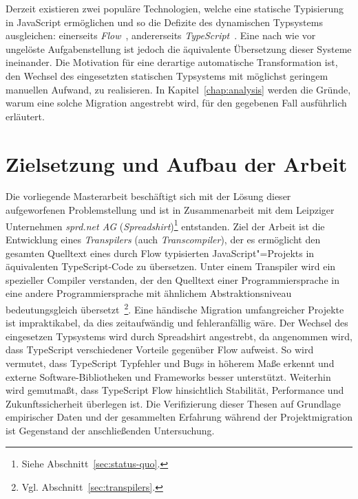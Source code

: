 Derzeit existieren zwei populäre Technologien, welche eine statische Typisierung in JavaScript ermöglichen und so die Defizite des dynamischen Typsystems ausgleichen: einerseits \textit{Flow}~\autocite{FLOW:PAPER}, andererseits \textit{TypeScript}~\autocite{TYPESCRIPT:SPEC}. Eine nach wie vor ungelöste Aufgabenstellung ist jedoch die äquivalente Übersetzung dieser Systeme ineinander. Die Motivation für eine derartige automatische Transformation ist, den Wechsel des eingesetzten statischen Typsystems mit möglichst geringem manuellen Aufwand, zu realisieren. In Kapitel~\ref{chap:analysis} werden die Gründe, warum eine solche Migration angestrebt wird, für den gegebenen Fall ausführlich erläutert.

\section{Zielsetzung und Aufbau der Arbeit}

Die vorliegende Masterarbeit beschäftigt sich mit der Lösung dieser aufgeworfenen Problemstellung und ist in Zusammenarbeit mit dem Leipziger Unternehmen \textit{sprd.net AG} (\textit{Spreadshirt})\footnote{Siehe Abschnitt~\ref{sec:status-quo}.} entstanden. Ziel der Arbeit ist die Entwicklung eines \emph{Transpilers} (auch \textit{Transcompiler}), der es ermöglicht den gesamten Quelltext eines durch Flow typisierten JavaScript"=Projekts in äquivalenten TypeScript-Code zu übersetzen. Unter einem Transpiler wird ein spezieller Compiler verstanden, der den Quelltext einer Programmiersprache in eine andere Programmiersprache mit ähnlichem Abstraktionsniveau bedeutungsgleich übersetzt~\autocite{EVGENIY:2016}\footnote{Vgl. Abschnitt~\ref{sec:transpilers}.}.
Eine händische Migration umfangreicher Projekte ist impraktikabel, da dies zeitaufwändig und fehleranfällig wäre. Der Wechsel des eingesetzen Typsystems wird durch Spreadshirt angestrebt, da angenommen wird, dass TypeScript verschiedener Vorteile gegenüber Flow aufweist. So wird vermutet, dass TypeScript Typfehler und Bugs in höherem Maße erkennt und externe Software-Bibliotheken und Frameworks besser unterstützt. Weiterhin wird gemutmaßt, dass TypeScript Flow hinsichtlich Stabilität, Performance und Zukunftssicherheit überlegen ist. Die Verifizierung dieser Thesen auf Grundlage empirischer Daten und der gesammelten Erfahrung während der Projektmigration ist Gegenstand der anschließenden Untersuchung.

